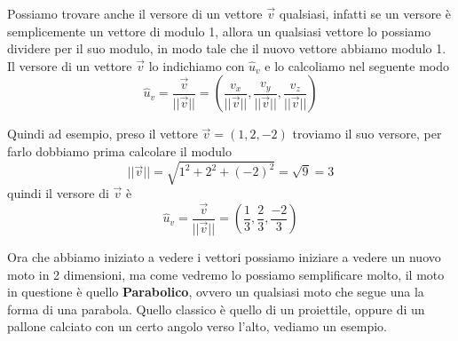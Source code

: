 \documentclass{rapport}
\begin{document}
Possiamo trovare anche il versore di un vettore $\vec{v}$ qualsiasi, infatti se un versore è semplicemente un vettore di modulo 1, allora un qualsiasi vettore lo possiamo dividere per il suo modulo, in modo tale che il nuovo vettore abbiamo modulo 1.  Il versore di un vettore $\vec{v}$ lo indichiamo con $\hat{u}_v$ e lo calcoliamo nel seguente modo 
\[
\hat{u}_v = \dfrac{\vec{v}}{||\vec{v}||} = \left(\dfrac{v_x}{||\vec{v}||},
  \dfrac{v_y}{||\vec{v}||},
  \dfrac{v_z}{||\vec{v}||} \right)
\]

Quindi ad esempio, preso il vettore $\vec{v} = (1,2,-2)$ troviamo il suo versore, per farlo dobbiamo prima calcolare il modulo 
\[
||\vec{v}|| = \sqrt{1^2 + 2^2 + (-2)^2} = \sqrt{9} = 3
\]
quindi il versore di $\vec{v}$ è 
\[
\hat{u}_v = \dfrac{\vec{v}}{||\vec{v}||} = \left(\dfrac{1}{3},
  \dfrac{2}{3},
  \dfrac{-2}{3} \right)
\]

\newpage
Ora che abbiamo iniziato a vedere i vettori possiamo iniziare a vedere un nuovo moto in 2 dimensioni, ma come vedremo lo possiamo semplificare molto, il moto in questione è quello \textbf{Parabolico}, ovvero un qualsiasi moto che segue una la forma di una parabola. Quello classico è quello di un proiettile, oppure di un pallone calciato con un certo angolo verso l'alto, vediamo un esempio.


\begin{figure}[htbp]
    \centering %
\end{figure}
\end{document}
